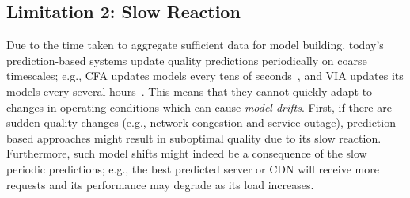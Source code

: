 



\subsection{Limitation 2: Slow Reaction}
Due to the time taken to aggregate sufficient data for model building, 
today's prediction-based systems update quality predictions periodically on
coarse timescales; e.g., CFA updates models every tens of seconds~\cite{cfa}, and VIA updates its models every several hours~\cite{via}. 
This  means that they cannot quickly adapt to changes in
operating conditions which can cause {\em model drifts}.  First, if there are
sudden quality changes (e.g., network congestion and service outage),
prediction-based approaches might result in suboptimal quality due to its slow reaction.  Furthermore, such model shifts might indeed be a
consequence of the slow periodic predictions; e.g., the best predicted server
or CDN will receive more requests and its performance may degrade
as its load increases.

